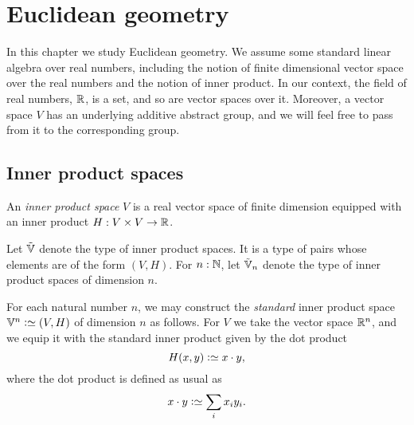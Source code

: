 \chapter{Euclidean geometry}
\label{ch:euclidean}


In this chapter we study Euclidean geometry.  We assume some standard linear
algebra over real numbers, including the notion of finite dimensional vector
space over the real numbers and the notion of inner product.  In our context,
the field of real numbers, $\mathbb{R}$, is a set, and so are vector spaces over it.
Moreover, a vector space $V$ has an underlying additive abstract group, and we
will feel free to pass from it to the corresponding group.

\section{Inner product spaces}

\begin{definition}\label{def:InnerProductSpace}
  An {\em inner product space} $V$ is a real vector space of finite dimension
  equipped with an inner product $H : V \times V \to \mathbb{R} $.
\end{definition}

Let ${\tilde {\mathbb V}}$ denote the type of inner product spaces.  It is a type of pairs whose
elements are of the form $(V,H)$.
For $n : \mathbb{N}$, let ${\tilde {\mathbb V}}_n$ denote the type of inner product spaces of dimension $n$.

For each natural number $n$, we may construct the {\em standard} inner product
space $\VV^n \defeq (V,H)$ of dimension $n$ as follows.  For $V$ we take the
vector space $\mathbb{R}^n$, and we equip it with the standard inner product given by
the dot product
$$ H ( x , y) \defeq x \cdot y, $$
where the dot product is defined as usual as
$$ x \cdot y \defeq \sum_i x_i y_i . $$

